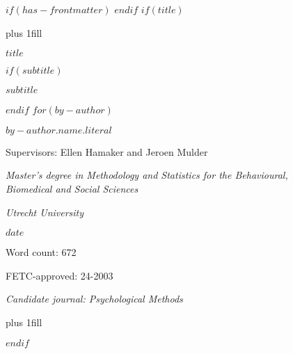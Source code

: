 $if(has-frontmatter)$
\frontmatter
$endif$
$if(title)$
\cleardoublepage
\thispagestyle{empty}
{\centering
\hbox{}\vskip 0cm plus 1fill
{\Large\bfseries $title$ \par}
$if(subtitle)$
\vspace{3ex}
{\large $subtitle$ \par}
$endif$
\vspace{9ex}
$for(by-author)$
{\large\bfseries $by-author.name.literal$ \par}
\vspace{3ex}
{\large Supervisors: Ellen Hamaker and Jeroen Mulder \par}
\vspace{9ex}
{\normalsize \textit{Master's degree in Methodology and Statistics for the Behavioural, \\ Biomedical and Social Sciences} \par}
\vspace{3ex}
{\normalsize \textit{Utrecht University} \par}
\vspace{9ex}
{\normalsize $date$ \par}
\vspace{3ex}
{\normalsize Word count: 672 \par}
\vspace{9ex}
{\normalsize FETC-approved: 24-2003 \par}
\vspace{9ex}
{\normalsize \textit{Candidate journal: Psychological Methods} \par}
\hbox{}\vskip 0cm plus 1fill
}
$endif$
